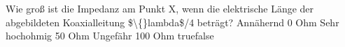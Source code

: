     {Wie groß ist die Impedanz am Punkt X, wenn die elektrische Länge der abgebildeten Koaxialleitung \$\textbackslash\{\}lambda\$/4 beträgt?}
    {Annähernd 0 Ohm}
    {Sehr hochohmig}
    {50 Ohm}
    {Ungefähr 100 Ohm}
    {true}{false}